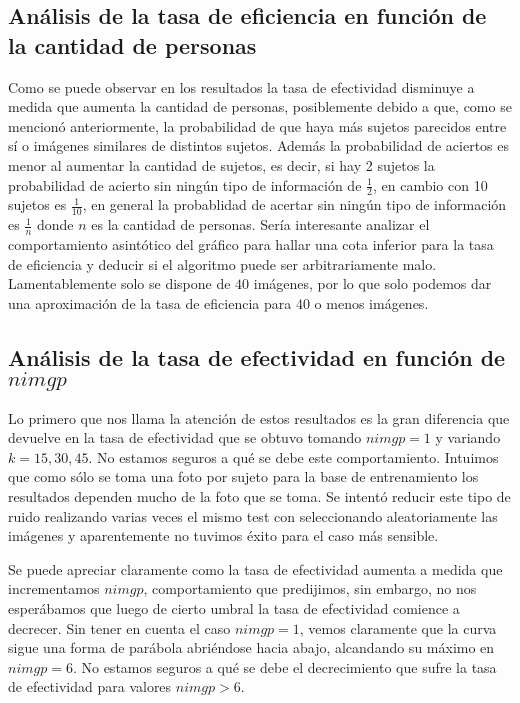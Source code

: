 \subsection{Análisis de la tasa de eficiencia en función de la cantidad de personas}
Como se puede observar en los resultados la tasa de efectividad disminuye a medida que aumenta la cantidad de personas, posiblemente debido a que, como se mencionó anteriormente, la probabilidad de que haya más sujetos parecidos entre sí o imágenes similares de distintos sujetos. Además la probabilidad de aciertos es menor al aumentar la cantidad de sujetos, es decir, si hay 2 sujetos la probabilidad de acierto sin ningún tipo de información de $\frac{1}{2}$, en cambio con 10 sujetos es $\frac{1}{10}$, en general la probablidad de acertar sin ningún tipo de información es $\frac{1}{n}$ donde $n$ es la cantidad de personas. Sería interesante analizar el comportamiento asintótico del gráfico para hallar una cota inferior para la tasa de eficiencia y deducir si el algoritmo puede ser arbitrariamente malo. Lamentablemente solo se dispone de $40$ imágenes, por lo que solo podemos dar una aproximación de la tasa de eficiencia para $40$ o menos imágenes.

\subsection{Análisis de la tasa de efectividad en función de $nimgp$}
Lo primero que nos llama la atención de estos resultados es la gran diferencia que devuelve en la tasa de efectividad que se obtuvo
tomando $nimgp = 1$ y variando $k = 15, 30, 45$. No estamos seguros a qué se debe este comportamiento. Intuimos que como sólo se toma
una foto por sujeto para la base de entrenamiento los resultados dependen mucho de la foto que se toma. Se intentó reducir este tipo
de ruido realizando varias veces el mismo test con seleccionando aleatoriamente las imágenes y aparentemente no tuvimos éxito para
el caso más sensible.
\par
Se puede apreciar claramente como la tasa de efectividad aumenta a medida que incrementamos $nimgp$, comportamiento que predijimos, sin embargo,
no nos esperábamos que luego de cierto umbral la tasa de efectividad comience a decrecer. Sin tener en cuenta el caso $nimgp = 1$, vemos 
claramente que la curva sigue una forma de parábola abriéndose hacia abajo, alcandando su máximo en $nimgp = 6$. No estamos seguros
a qué se debe el decrecimiento que sufre la tasa de efectividad para valores $nimgp > 6$.

